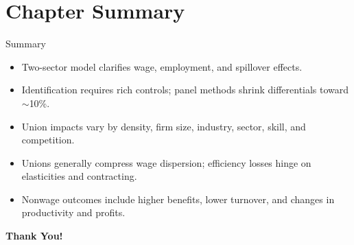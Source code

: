 \documentclass[aspectratio=169]{beamer}
\begin{document}
\section{Chapter Summary}

\begin{frame}{Summary}
\transfade
\begin{itemize}[<+->]
  \item Two-sector model clarifies wage, employment, and spillover effects.
  \item Identification requires rich controls; panel methods shrink differentials toward $\sim$10\%.
  \item Union impacts vary by density, firm size, industry, sector, skill, and competition.
  \item Unions generally compress wage dispersion; efficiency losses hinge on elasticities and contracting.
  \item Nonwage outcomes include higher benefits, lower turnover, and changes in productivity and profits.
\end{itemize}
\end{frame}

\begin{frame}
\centering
\Huge{\textbf{Thank You!}} \\

\end{frame}
\end{document}

